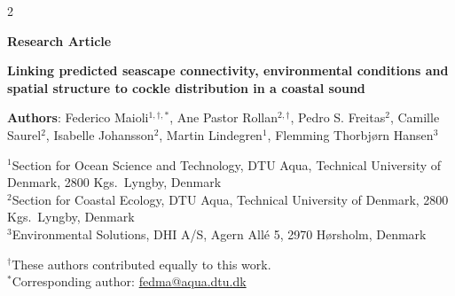 \begin{spacing}{2}   %

\noindent

\noindent
\textbf{Research Article}   %

\noindent
\textbf{Linking predicted seascape connectivity, environmental conditions and spatial structure to cockle distribution in a coastal sound}

\noindent
\textbf{Authors}: Federico Maioli$^{1,\dagger,*}$, Ane Pastor Rollan$^{2,\dagger}$, Pedro S. Freitas$^{2}$, Camille Saurel$^{2}$, Isabelle Johansson$^{2}$, Martin Lindegren$^{1}$, Flemming Thorbjørn Hansen$^{3}$

\vspace{0.5em}
\noindent
$^{1}$Section for Ocean Science and Technology, DTU Aqua, Technical University of Denmark, 2800 Kgs.\ Lyngby, Denmark\\
$^{2}$Section for Coastal Ecology, DTU Aqua, Technical University of Denmark, 2800 Kgs.\ Lyngby, Denmark\\
$^{3}$Environmental Solutions, DHI A/S, Agern Allé 5, 2970 Hørsholm, Denmark

\vspace{0.5em}
\noindent
$^{\dagger}$These authors contributed equally to this work.\\
$^{*}$Corresponding author: \href{mailto:fedma@aqua.dtu.dk}{fedma@aqua.dtu.dk}

\noindent 



\linenumbers
\setcounter{secnumdepth}{3}   %
\clearpage


\end{spacing}
